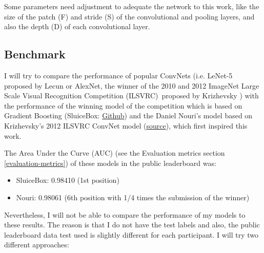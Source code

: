 \documentclass[]{article}
\newcommand{\imagenet}{ImageNet Large Scale Visual Recognition Competition (ILSVRC)}
\begin{document}
Some parameters need adjustment to adequate the network to this work, like the size of the patch (F) and stride (S) of the convolutional and pooling layers, and also the depth (D) of each convolutional layer. %

\subsection{Benchmark}\label{benchmark}

I will try to compare the performance of popular ConvNets (i.e. LeNet-5 proposed by Lecun \cite{Lecun98} or AlexNet, the winner of the 2010 and 2012 \imagenet \, proposed by Krizhevsky \cite{Krizhevsky12, Krizhevsky2010}) with the performance of the winning model of the competition which is based on Gradient Boosting (SluiceBox: \href{https://github.com/nmkridler/moby}{Github}) and the Daniel Nouri's model based on Krizhevsky's 2012 ILSVRC ConvNet model \cite{Krizhevsky12} (\href{https://speakerdeck.com/dnouri/practical-deep-neural-nets-for-detecting-marine-mammals/}{source}), which first inspired this work.

The Area Under the Curve (AUC) (see the Evaluation metrics section \ref{evaluation-metrics}) of these models in the public leaderboard was:

\begin{itemize}
	\item SluiceBox: 0.98410 (1st position)
	\item Nouri: 0.98061 (6th position with 1/4 times the submission of the winner)
\end{itemize}

Nevertheless, I will not be able to compare the performance of my models to these results. The reason is that I do not have the test labels and also, the public leaderboard data test used is slightly different for each participant. I will try two different approaches:
\end{document}
